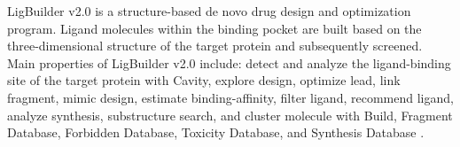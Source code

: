     LigBuilder v2.0 is a structure-based de novo drug design and optimization program. Ligand molecules within the binding pocket are built based on the three-dimensional structure of the target protein and subsequently screened. Main properties of LigBuilder v2.0 include: detect and analyze the ligand-binding site of the target protein with Cavity, explore design, optimize lead, link fragment, mimic design, estimate binding-affinity, filter ligand, recommend ligand, analyze synthesis, substructure search,  and cluster molecule with Build, Fragment Database, Forbidden Database, Toxicity Database, and Synthesis Database \cite{Wang_2000}.